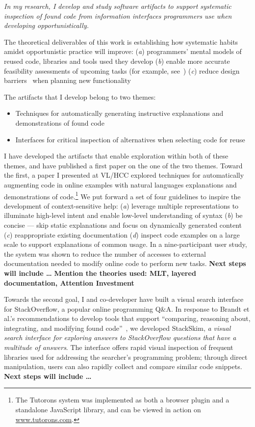 \documentclass[12pt]{memoir}
\begin{document}
\emph{In my research, I develop and study software artifacts to support systematic inspection of found code from information interfaces programmers use when developing opportunistically.}

The theoretical deliverables of this work is establishing how systematic habits amidst opportunistic practice will improve:
(\emph{a}) programmers' mental models of reused code, libraries and tools used they develop
(\emph{b}) enable more accurate feasibility assessments of upcoming tasks (for example, see~\cite{ko_role_2011})
(\emph{c}) reduce design barriers~\cite{ko_six_2004} when planning new functionality

The artifacts that I develop belong to two themes:
\begin{itemize}[noitemsep]
\item Techniques for automatically generating instructive explanations and demonstrations of found code
\item Interfaces for critical inspection of alternatives when selecting code for reuse
\end{itemize}

I have developed the artifacts that enable exploration within both of these themes, and have published a first paper on the one of the two themes.
Toward the first, a paper I presented at VL/HCC explored techniques for automatically augmenting code in online examples with natural languages explanations and demonstrations of code.\footnote{%
The Tutorons system was implemented as both a browser plugin and a standalone JavaScript library, and can be viewed in action on \url{www.tutorons.com}.
}
We put forward a set of four guidelines to inspire the development of context-sensitive help:
(\emph{a}) leverage multiple representations to illuminate high-level intent and enable low-level understanding of syntax
(\emph{b}) be concise --- skip static explanations and focus on dynamically generated content
(\emph{c}) reappropriate existing documentation
(\emph{d}) inspect code examples on a large scale to support explanations of common usage.
In a nine-participant user study, the system was shown to reduce the number of accesses to external documentation needed to modify online code to perform new tasks.
\textbf{Next steps will include \ldots}
\textbf{Mention the theories used: MLT, layered documentation, Attention Investment}

Towards the second goal, I and co-developer have built a visual search interface for StackOverflow, a popular online programming Q\&A.
In response to Brandt et al.'s recommendations to develop tools that support ``comparing, reasoning about, integrating, and modifying found code''~\cite{brandt_opportunistic_2008}, we developed StackSkim, \emph{a visual search interface for exploring answers to StackOverflow questions that have a multitude of answers}.
The interface offers rapid visual inspection of frequent libraries used for addressing the searcher's programming problem;
through direct manipulation, users can also rapidly collect and compare similar code snippets.
\textbf{Next steps will include \ldots}
\end{document}
